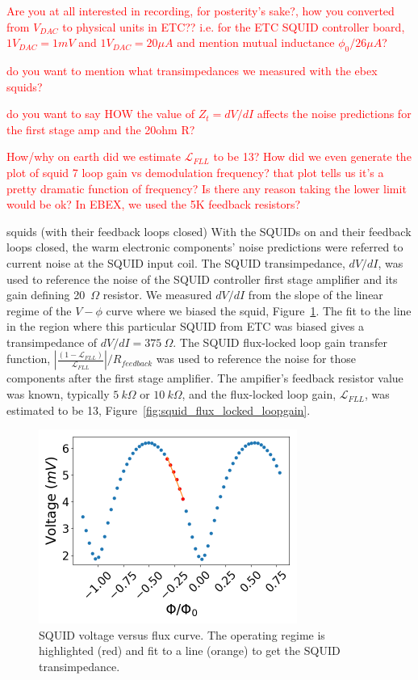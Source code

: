 \textcolor{red}{Are you at all interested in recording, for posterity's sake?, how you converted from $V_{DAC}$ to physical units in \ac{ETC}?? i.e. for the \ac{ETC} \ac{SQUID} controller board, $1 V_{DAC} = 1 mV$ and $1 V_{DAC} = 20 \mu A$ and mention mutual inductance $\phi_{0}/26 \mu A$?}

\textcolor{red}{do you want to mention what transimpedances we measured with the ebex squids?}

\textcolor{red}{ do you want to say HOW the value of $Z_{t} = dV/dI$ affects the noise predictions for the first stage amp and the 20ohm R?}

\textcolor{red}{How/why on earth did we estimate $\mathscr{L}_{FLL}$ to be 13? How did we even generate the plot of squid 7 loop gain vs demodulation frequency? that plot tells us it's a pretty dramatic function of frequency? Is there any reason taking the lower limit would be ok? In EBEX, we used the 5K feedback resistors?}

squids (with their feedback loops closed)
With the \ac{SQUID}s on and their feedback loops closed, the warm electronic components' noise predictions were referred to current noise at the \ac{SQUID} input coil.
The \ac{SQUID} transimpedance, $dV/dI$, was used to reference the noise of the \ac{SQUID} controller first stage amplifier and its gain defining 20~$\Omega$ resistor. 
We measured $dV/dI$ from the slope of the linear regime of the $V-\phi$ curve where we biased the squid, Figure~\ref{fig:squid_transimpedance}. 
The fit to the line in the region where this particular \ac{SQUID} from \ac{ETC} was biased gives a transimpedance of $dV/dI=375~\Omega$. 
The \ac{SQUID} flux-locked loop gain transfer function, $|\frac{(1-\mathscr{L}_{FLL})}{\mathscr{L}_{FLL}}|/R_{feedback}$ was used to reference the noise for those components after the first stage amplifier. 
The ampifier's feedback resistor value was known, typically $5~k\Omega$ or $10~k\Omega$, and the flux-locked loop gain, $\mathscr{L}_{FLL}$, was estimated to be 13, Figure~\ref{fig:squid_flux_locked_loopgain}. 

\begin{figure}[ht!]
\begin{center}
\includegraphics[height=2.5in]{figures/vphi_physical.png}
\caption{\ac{SQUID} voltage versus flux curve. The operating regime is highlighted (red) and fit to a line (orange) to get the \ac{SQUID} transimpedance.
\label{fig:squid_transimpedance} }
\end{center}
\end{figure}

